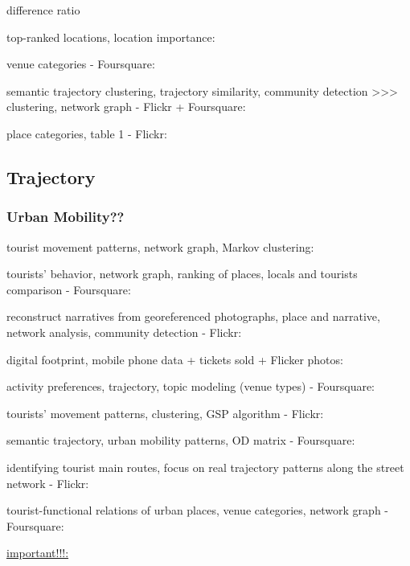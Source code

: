\documentclass{article}
\begin{document}
difference ratio \cite{li_analyzing_2018}

top-ranked locations, location importance: \cite{yin_diversified_2011}

venue categories - Foursquare: \cite{ferreira_uncovering_2020}

semantic trajectory clustering, trajectory similarity, community detection >>> clustering, network graph - Flickr + Foursquare: \cite{liu_stccd_2020}

place categories, table 1 - Flickr: \cite{donaire_tourist_2014}


\subsection{Trajectory}

\subsubsection{Urban Mobility??}
tourist movement patterns, network graph, Markov clustering: \cite{hu_graph-based_2019}

tourists' behavior, network graph, ranking of places, locals and tourists comparison - Foursquare: \cite{ferreira_beyond_2015}

reconstruct narratives from georeferenced photographs, place and narrative, network analysis, community detection - Flickr: \cite{straumann_towards_2014}

digital footprint, mobile phone data + tickets sold + Flicker photos: \cite{girardin_digital_2008}

activity preferences, trajectory, topic modeling (venue types) - Foursquare: \cite{vu_discovering_2019}

tourists' movement patterns, clustering, GSP algorithm - Flickr: \cite{hopken_flickr_2020}

semantic trajectory, urban mobility patterns, OD matrix - Foursquare: \cite{nin_tweets_2014}

identifying tourist main routes, focus on real trajectory patterns along the street network - Flickr: \cite{mohino_identifying_2018}

tourist-functional relations of urban places, venue categories, network graph - Foursquare: \cite{yang_identifying_2021}

\underline{important!!!: \cite{parent_semantic_2013}}
\end{document}
